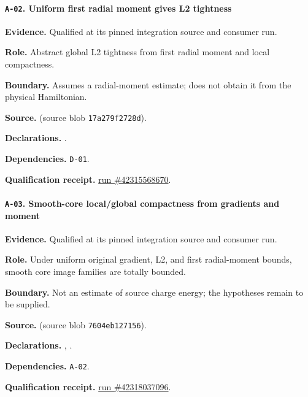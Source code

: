 \paragraph{\texttt{A-02}. Uniform first radial moment gives L2 tightness}
\noindent\textbf{Evidence.} Qualified at its pinned integration source and consumer run.
\par\noindent\textbf{Role.} Abstract global L2 tightness from first radial moment and local compactness.
\par\noindent\textbf{Boundary.} Assumes a radial-moment estimate; does not obtain it from the physical Hamiltonian.
\par\noindent\textbf{Source.}  (source blob \texttt{17a279f2728d}).
\par\noindent\textbf{Declarations.} .
\par\noindent\textbf{Dependencies.} \texttt{D-01}.
\par\noindent\textbf{Qualification receipt.} \href{https://github.com/etblink/math/actions/runs/42315568670}{run \#42315568670}.
\medskip

\paragraph{\texttt{A-03}. Smooth-core local/global compactness from gradients and moment}
\noindent\textbf{Evidence.} Qualified at its pinned integration source and consumer run.
\par\noindent\textbf{Role.} Under uniform original gradient, L2, and first radial-moment bounds, smooth core image families are totally bounded.
\par\noindent\textbf{Boundary.} Not an estimate of source charge energy; the hypotheses remain to be supplied.
\par\noindent\textbf{Source.}  (source blob \texttt{7604eb127156}).
\par\noindent\textbf{Declarations.} , .
\par\noindent\textbf{Dependencies.} \texttt{A-02}.
\par\noindent\textbf{Qualification receipt.} \href{https://github.com/etblink/math/actions/runs/42318037096}{run \#42318037096}.
\medskip

